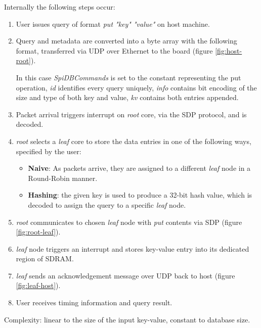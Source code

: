 Internally the following steps occur:
\begin{enumerate}
\item User issues query of format \textit{put "key" "value"} on host machine.
\item Query and metadata are converted into a byte array with the following format, transferred via UDP over Ethernet to the board (figure \ref{fig:host-root}).

In this case \textit{SpiDBCommands} is set to the constant representing the put operation, \textit{id} identifies every query uniquely, \textit{info} contains bit encoding of the size and type of both key and value, \textit{k\textunderscore v} contains both entries appended.
\item Packet arrival triggers interrupt on \textit{root} core, via the SDP protocol, and is decoded.
\item \textit{root} selects a \textit{leaf} core to store the data entries in one of the following ways, specified by the user:
\begin{itemize}
	\item \textbf{Naive}: As packets arrive, they are assigned to a different \textit{leaf} node in a Round-Robin manner.
	\item \textbf{Hashing}: the given key is used to produce a 32-bit hash value, which is decoded to assign the query to a specific \textit{leaf} node.
\end{itemize}
\item \textit{root} communicates to chosen \textit{leaf} node with \textit{put} contents via SDP (figure \ref{fig:root-leaf}).
\item \textit{leaf} node triggers an interrupt and stores key-value entry into its dedicated region of SDRAM.
\item \textit{leaf} sends an acknowledgement message over UDP back to host (figure \ref{fig:leaf-host}).
\item User receives timing information and query result.
\end{enumerate}


Complexity: linear to the size of the input key-value, constant to database size.

